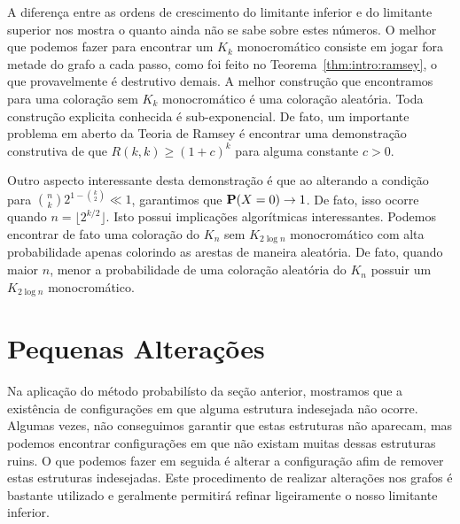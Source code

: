 A diferença entre as ordens de crescimento do limitante inferior e do limitante superior nos mostra o quanto ainda não se sabe sobre estes números. O melhor que podemos fazer para encontrar um $K_k$ monocromático consiste em jogar fora metade do grafo a cada passo, como foi feito no Teorema~\ref{thm:intro:ramsey}, o que provavelmente é destrutivo demais. A melhor construção que encontramos para uma coloração sem $K_k$ monocromático é uma coloração aleatória. Toda construção explicita conhecida é sub-exponencial. De fato, um importante problema em aberto da Teoria de Ramsey é encontrar uma demonstração construtiva de que $R(k,k) \geq (1+c)^k$ para alguma constante $c > 0$.

Outro aspecto interessante desta demonstração é que ao alterando a condição para $\binom{n}{k} 2^{1 - \binom{k}{2}} \ll 1$, garantimos que $\operatorname{\mathbf{P}}(X = 0) \to 1$. De fato, isso ocorre quando $n = \lfloor 2^{k/2} \rfloor$. Isto possui implicações algorítmicas interessantes. Podemos encontrar de fato uma coloração do $K_n$ sem $K_{2\log n}$ monocromático com alta probabilidade apenas colorindo as arestas de maneira aleatória. De fato, quando maior $n$, menor a probabilidade de uma coloração aleatória do $K_n$ possuir um $K_{2\log n}$ monocromático.


\section{Pequenas Alterações}

Na aplicação do método probabilísto da seção anterior, mostramos que a existência de configurações em que alguma estrutura indesejada não ocorre. Algumas vezes, não conseguimos garantir que estas estruturas não aparecam, mas podemos encontrar configurações em que não existam muitas dessas estruturas ruins. O que podemos fazer em seguida é alterar a configuração afim de remover estas estruturas indesejadas. Este procedimento de realizar alterações nos grafos é bastante utilizado e geralmente permitirá refinar ligeiramente o nosso limitante inferior.

